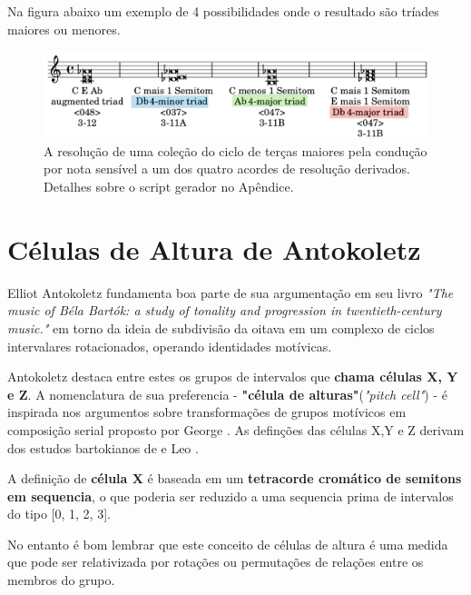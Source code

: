 \documentclass[
	12pt,				%
	openright,			%
	twoside,			%
	a4paper,			%
	english,			%
	french,				%
	spanish,			%
	brazil				%
	]{abntex2}
\begin{document}
Na figura abaixo um exemplo de 4 possibilidades onde o resultado são tríades maiores ou menores.

\begin{figure}[!h]
	\caption{\label{fig_grafico}A resolução de uma coleção do ciclo de terças maiores pela condução por nota sensível a um dos quatro acordes de resolução derivados. Detalhes sobre o script gerador no Apêndice.   }
	\begin{center}
	    \includegraphics[scale=0.3]{ciclos/transpoe_triades_aumentadas.png}
	\end{center}
\end{figure}
\pagebreak



\section{Células de Altura de Antokoletz}

Elliot Antokoletz fundamenta boa parte de sua argumentação em seu livro \textit{"The music of Béla Bartók: a study of tonality and progression in twentieth-century music."}\cite{antokoletz1984music} em torno da ideia de subdivisão da oitava em um complexo de ciclos intervalares rotacionados, operando identidades motívicas. 

Antokoletz destaca entre estes os grupos de intervalos que \textbf{chama células X, Y e Z}\cite[ p.69-77]{antokoletz1984music}. A nomenclatura de sua preferencia - \textbf{"célula de alturas"}(\textit{"pitch cell"}) - é inspirada nos argumentos sobre transformações de grupos motívicos em composição serial proposto por George . As definções das células X,Y e Z derivam dos estudos bartokianos de  e Leo .

A definição de \textbf{célula X } é baseada em um \textbf{tetracorde cromático de semitons em sequencia}, o que poderia ser reduzido a uma sequencia prima de intervalos do tipo [0, 1, 2, 3]. 

No entanto é bom lembrar que este conceito de células de altura é uma medida que pode ser relativizada por rotações ou permutações de relações entre os membros do grupo.
\end{document}
